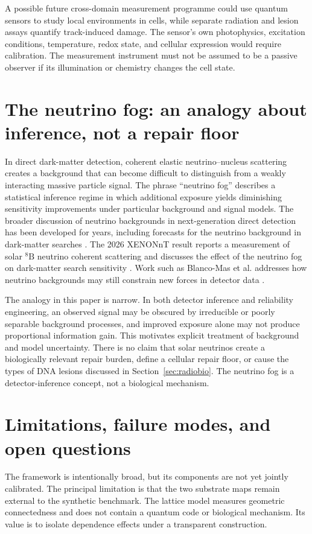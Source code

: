 \documentclass[11pt,a4paper,oneside]{article}
\begin{document}
A possible future cross-domain measurement programme could use quantum sensors to study local environments in cells, while separate radiation and lesion assays quantify track-induced damage. The sensor's own photophysics, excitation conditions, temperature, redox state, and cellular expression would require calibration. The measurement instrument must not be assumed to be a passive observer if its illumination or chemistry changes the cell state.

\section{The neutrino fog: an analogy about inference, not a repair floor}
\label{sec:neutrino}
In direct dark-matter detection, coherent elastic neutrino--nucleus scattering creates a background that can become difficult to distinguish from a weakly interacting massive particle signal. The phrase ``neutrino fog'' describes a statistical inference regime in which additional exposure yields diminishing sensitivity improvements under particular background and signal models. The broader discussion of neutrino backgrounds in next-generation direct detection has been developed for years, including forecasts for the neutrino background in dark-matter searches \citep{Billard2014}. The 2026 XENONnT result reports a measurement of solar \(^{8}\mathrm{B}\) neutrino coherent scattering and discusses the effect of the neutrino fog on dark-matter search sensitivity \citep{XENON2026}. Work such as Blanco-Mas et al. addresses how neutrino backgrounds may still constrain new forces in detector data \citep{BlancoMas2025}.

The analogy in this paper is narrow. In both detector inference and reliability engineering, an observed signal may be obscured by irreducible or poorly separable background processes, and improved exposure alone may not produce proportional information gain. This motivates explicit treatment of background and model uncertainty. There is no claim that solar neutrinos create a biologically relevant repair burden, define a cellular repair floor, or cause the types of DNA lesions discussed in Section~\ref{sec:radiobio}. The neutrino fog is a detector-inference concept, not a biological mechanism.

\section{Limitations, failure modes, and open questions}
\label{sec:limitations}
The framework is intentionally broad, but its components are not yet jointly calibrated. The principal limitation is that the two substrate maps remain external to the synthetic benchmark. The lattice model measures geometric connectedness and does not contain a quantum code or biological mechanism. Its value is to isolate dependence effects under a transparent construction.
\end{document}
